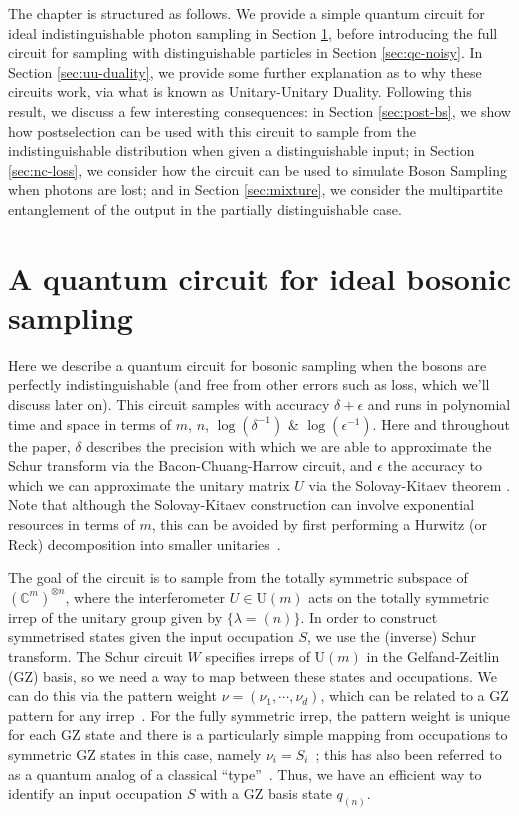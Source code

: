 The chapter is structured as follows. 
We provide a simple quantum circuit for ideal indistinguishable photon sampling in Section \ref{sec:qc-bs}, before introducing the full circuit for sampling with distinguishable particles in Section \ref{sec:qc-noisy}. 
In Section \ref{sec:uu-duality}, we provide some further explanation as to why these circuits work, via what is known as Unitary-Unitary Duality.
Following this result, we discuss a few interesting consequences: in Section \ref{sec:post-bs}, we show how postselection can be used with this circuit to sample from the indistinguishable distribution when given a distinguishable input; in Section \ref{sec:nc-loss}, we consider how the circuit can be used to simulate Boson Sampling when photons are lost; and in Section \ref{sec:mixture}, we consider the multipartite entanglement of the output in the partially distinguishable case. 

\section{A quantum circuit for ideal bosonic sampling}
\label{sec:qc-bs}

Here we describe a quantum circuit for bosonic sampling when the bosons are perfectly indistinguishable (and free from other errors such as loss, which we'll discuss later on). 
This circuit samples with accuracy $\delta + \epsilon$ and runs in polynomial time and space in terms of $m$, $n$, $\log(\delta^{-1})$ \& $\log(\epsilon^{-1})$. 
Here and throughout the paper, $\delta$ describes the precision with which we are able to approximate the Schur transform via the Bacon-Chuang-Harrow circuit, and $\epsilon$ the accuracy to which we can approximate the unitary matrix $U$ via the Solovay-Kitaev theorem \cite{nielsen2010,dawson2006}.
Note that although the Solovay-Kitaev construction can involve exponential resources in terms of $m$, this can be avoided by first performing a Hurwitz (or Reck) decomposition into smaller unitaries~\cite{hurwitz1897, reck1994, barenco1995}.

The goal of the circuit is to sample from the totally symmetric subspace of $(\mathbb{C}^m)^{\otimes n}$, where the interferometer $U \in \textrm{U}(m)$ acts on the totally symmetric irrep of the unitary group given by $\{ \lambda = (n)\}$.
In order to construct symmetrised states given the input occupation $S$, we use the (inverse) Schur transform. 
The Schur circuit $W$ specifies irreps of U$(m)$ in the Gelfand-Zeitlin (GZ) basis, so we need a way to map between these states and occupations. 
We can do this via the pattern weight $\nu = (\nu_1,\cdots,\nu_d)$, which can be related to a GZ pattern for any irrep~\cite{alex2011}. 
For the fully symmetric irrep, the pattern weight is unique for each GZ state and there is a particularly simple mapping from occupations to symmetric GZ states in this case, namely $\nu_i = S_i$~\cite{rowe1999}; this has also been referred to as a quantum analog of a classical ``type''~\cite{harrow2005}.
Thus, we have an efficient way to identify an input occupation $S$ with a GZ basis state $q_{(n)}$.

